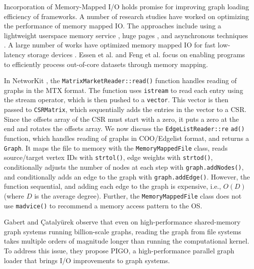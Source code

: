 Incorporation of Memory-Mapped I/O holds promise for improving graph loading efficiency of frameworks. A number of research studies have worked on optimizing the performance of memory mapped IO. The approaches include using a lightweight userspace memory service \cite{li2019userland}, huge pages \cite{malliotakis2021hugemap}, and asynchronous techniques \cite{imamura2019poster}. A large number of works have optimized memory mapped IO for fast low-latency storage devices \cite{song2012low, song2016efficient, papagiannis2020optimizing, papagiannis2021memory, alverti2022daxvm, leis2023virtual}. Essen et al. \cite{van2015di} and Feng et al. \cite{feng2023tricache} focus on enabling programs to efficiently process out-of-core datasets through memory mapping.

In NetworKit \cite{staudt2016networkit}, the \texttt{MatrixMarketReader::read()} function handles reading of graphs in the MTX format. The function uses \texttt{istream} to read each entry using the stream operator, which is then pushed to a \texttt{vector}. This vector is then passed to \texttt{CSRMatrix}, which sequentially adds the entries in the vector to a CSR. Since the offsets array of the CSR must start with a zero, it puts a zero at the end and rotates the offsets array. We now discuss the \texttt{EdgeListReader::re} \texttt{ad()} function, which handles reading of graphs in COO/Edgelist format, and returns a \texttt{Graph}. It maps the file to memory with the \texttt{MemoryMappedFile} class, reads source/target vertex IDs with \texttt{strtol()}, edge weights with \texttt{strtod()}, conditionally adjusts the number of nodes at each step with \texttt{graph.addNodes()}, and conditionally adds an edge to the graph with \texttt{graph.addEdge()}. However, the function sequential, and adding each edge to the graph is expensive, i.e., $O(D)$ (where $D$ is the average degree). Further, the \texttt{MemoryMappedFile} class does not use \texttt{madvice()} to recommend a memory access pattern to the OS.

Gabert and Çatalyürek \cite{gabert2021pigo} observe that even on high-performance shared-memory graph systems running billion-scale graphs, reading the graph from file systems takes multiple orders of magnitude longer than running the computational kernel. To address this issue, they propose PIGO, a high-performance parallel graph loader that brings I/O improvements to graph systems.

